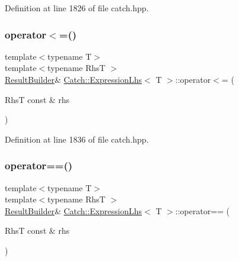 Definition at line 1826 of file catch.\+hpp.

\hypertarget{class_catch_1_1_expression_lhs_afd188990e8a14b49c308ce7a79056846}{}\label{class_catch_1_1_expression_lhs_afd188990e8a14b49c308ce7a79056846} 
\subsubsection{\texorpdfstring{operator$<$=()}{operator<=()}}
{\footnotesize\ttfamily template$<$typename T$>$ \\
template$<$typename RhsT $>$ \\
\hyperlink{class_catch_1_1_result_builder}{Result\+Builder}\& \hyperlink{class_catch_1_1_expression_lhs}{Catch\+::\+Expression\+Lhs}$<$ T $>$\+::operator$<$= (\begin{DoxyParamCaption}\item[{RhsT const \&}]{rhs }\end{DoxyParamCaption})\hspace{0.3cm}{\ttfamily [inline]}}



Definition at line 1836 of file catch.\+hpp.

\hypertarget{class_catch_1_1_expression_lhs_a2f7ad442c3e5e5764eee736345c40301}{}\label{class_catch_1_1_expression_lhs_a2f7ad442c3e5e5764eee736345c40301} 
\subsubsection{\texorpdfstring{operator==()}{operator==()}\hspace{0.1cm}{\footnotesize\ttfamily [1/2]}}
{\footnotesize\ttfamily template$<$typename T$>$ \\
template$<$typename RhsT $>$ \\
\hyperlink{class_catch_1_1_result_builder}{Result\+Builder}\& \hyperlink{class_catch_1_1_expression_lhs}{Catch\+::\+Expression\+Lhs}$<$ T $>$\+::operator== (\begin{DoxyParamCaption}\item[{RhsT const \&}]{rhs }\end{DoxyParamCaption})\hspace{0.3cm}{\ttfamily [inline]}}



